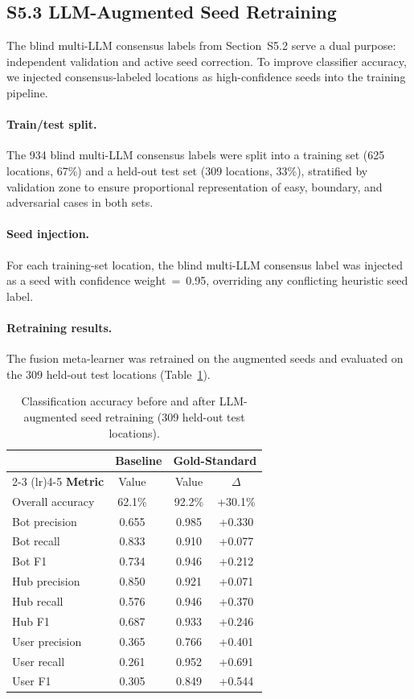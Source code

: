 \documentclass[11pt,a4paper]{article}
\begin{document}
\subsection{S5.3 LLM-Augmented Seed Retraining}

The blind multi-LLM consensus labels from Section~S5.2 serve a dual purpose: independent validation and active seed correction. To improve classifier accuracy, we injected consensus-labeled locations as high-confidence seeds into the training pipeline.

\paragraph{Train/test split.}
The 934 blind multi-LLM consensus labels were split into a training set (625 locations, 67\%) and a held-out test set (309 locations, 33\%), stratified by validation zone to ensure proportional representation of easy, boundary, and adversarial cases in both sets.

\paragraph{Seed injection.}
For each training-set location, the blind multi-LLM consensus label was injected as a seed with confidence weight~=~0.95, overriding any conflicting heuristic seed label.

\paragraph{Retraining results.}
The fusion meta-learner was retrained on the augmented seeds and evaluated on the 309 held-out test locations (Table~\ref{tab:retraining_comparison}).

\begin{table}[H]
\centering
\caption{Classification accuracy before and after LLM-augmented seed retraining (309 held-out test locations).}
\label{tab:retraining_comparison}
\small
\begin{tabular}{lcccc}
\toprule
& \multicolumn{2}{c}{\textbf{Baseline}} & \multicolumn{2}{c}{\textbf{Gold-Standard}} \\
\cmidrule(lr){2-3} \cmidrule(lr){4-5}
\textbf{Metric} & Value & & Value & $\Delta$ \\
\midrule
Overall accuracy & 62.1\% & & 92.2\% & +30.1\% \\
\midrule
Bot precision & 0.655 & & 0.985 & +0.330 \\
Bot recall & 0.833 & & 0.910 & +0.077 \\
Bot F1 & 0.734 & & 0.946 & +0.212 \\
\midrule
Hub precision & 0.850 & & 0.921 & +0.071 \\
Hub recall & 0.576 & & 0.946 & +0.370 \\
Hub F1 & 0.687 & & 0.933 & +0.246 \\
\midrule
User precision & 0.365 & & 0.766 & +0.401 \\
User recall & 0.261 & & 0.952 & +0.691 \\
User F1 & 0.305 & & 0.849 & +0.544 \\
\bottomrule
\end{tabular}
\end{table}
\end{document}
